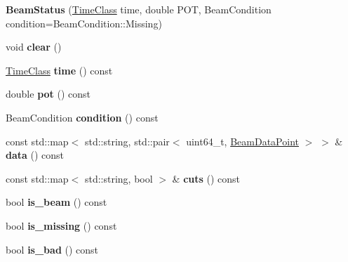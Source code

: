 \begin{DoxyCompactItemize}
\item 
\hypertarget{classBeamStatus_a8763cbecad2a03bdc4d4799fd2d68569}{
{\bfseries BeamStatus} (\hyperlink{classTimeClass}{TimeClass} time, double POT, BeamCondition condition=BeamCondition::Missing)}
\label{classBeamStatus_a8763cbecad2a03bdc4d4799fd2d68569}

\item 
\hypertarget{classBeamStatus_ad9786a1628d6180d3abbc74daef3d677}{
void {\bfseries clear} ()}
\label{classBeamStatus_ad9786a1628d6180d3abbc74daef3d677}

\item 
\hypertarget{classBeamStatus_a041fe2a720d2c24391fdaa578754e315}{
\hyperlink{classTimeClass}{TimeClass} {\bfseries time} () const }
\label{classBeamStatus_a041fe2a720d2c24391fdaa578754e315}

\item 
\hypertarget{classBeamStatus_a234b45ea673b396d29b4a40061c633c9}{
double {\bfseries pot} () const }
\label{classBeamStatus_a234b45ea673b396d29b4a40061c633c9}

\item 
\hypertarget{classBeamStatus_a1e0b28ff6f6e0fdc60242e395d836dca}{
BeamCondition {\bfseries condition} () const }
\label{classBeamStatus_a1e0b28ff6f6e0fdc60242e395d836dca}

\item 
\hypertarget{classBeamStatus_a0d1a612eece988337b69b39b73d8170e}{
const std::map$<$ std::string, std::pair$<$ uint64\_\-t, \hyperlink{structBeamDataPoint}{BeamDataPoint} $>$ $>$ \& {\bfseries data} () const }
\label{classBeamStatus_a0d1a612eece988337b69b39b73d8170e}

\item 
\hypertarget{classBeamStatus_a4b0a3f4fcce7aa7e3fa1e62c6f833d57}{
const std::map$<$ std::string, bool $>$ \& {\bfseries cuts} () const }
\label{classBeamStatus_a4b0a3f4fcce7aa7e3fa1e62c6f833d57}

\item 
\hypertarget{classBeamStatus_a106c1657c2cc64e76fac1179ba411485}{
bool {\bfseries is\_\-beam} () const }
\label{classBeamStatus_a106c1657c2cc64e76fac1179ba411485}

\item 
\hypertarget{classBeamStatus_a81a21d4debb9d1497024398bd8834ba3}{
bool {\bfseries is\_\-missing} () const }
\label{classBeamStatus_a81a21d4debb9d1497024398bd8834ba3}

\item 
\hypertarget{classBeamStatus_af51602157cd9beb020fd01cc72dd95cd}{
bool {\bfseries is\_\-bad} () const }
\label{classBeamStatus_af51602157cd9beb020fd01cc72dd95cd}


\end{DoxyCompactItemize}
